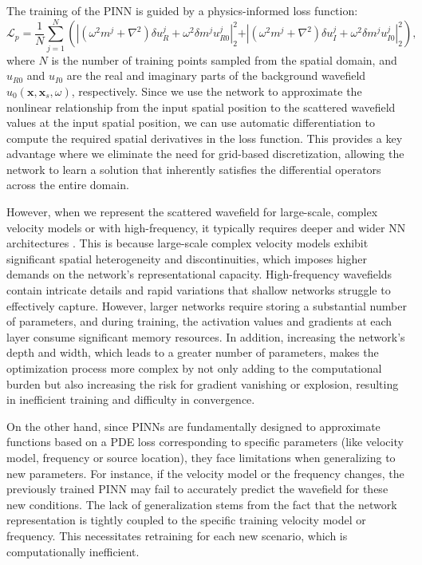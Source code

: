 The training of the PINN is guided by a physics-informed loss function:
\begin{equation}\label{eq6}
\mathcal{L}_{p} = \frac{1}{N}\sum\limits_{j=1}^{N} \left ( {\left|(\omega^2 m^j + \nabla^2)\delta u_R^j + \omega^2 \delta m^j u_{R0}^j \right|_2^2 } \right. 
\left. {+ \left|(\omega^2 m^j + \nabla^2)\delta u_I^j + \omega^2 \delta m^j u_{I0}^j \right|_2^2 }\right),
\end{equation}
where $N$ is the number of training points sampled from the spatial domain, and $u_{R0}$ and $u_{I0}$ are the real and imaginary parts of the background wavefield $u_0(\mathbf{x}, \mathbf{x}_s, \omega)$, respectively. Since we use the network to approximate the nonlinear relationship from the input spatial position to the scattered wavefield values at the input spatial position, we can use automatic differentiation to compute the required spatial derivatives in the loss function. This provides a key advantage where we eliminate the need for grid-based discretization, allowing the network to learn a solution that inherently satisfies the differential operators across the entire domain. 

However, when we represent the scattered wavefield for large-scale, complex velocity models or with high-frequency, it typically requires deeper and wider NN architectures \citep{alkhalifah2021wavefield}. This is because large-scale complex velocity models exhibit significant spatial heterogeneity and discontinuities, which imposes higher demands on the network's representational capacity. High-frequency wavefields contain intricate details and rapid variations that shallow networks struggle to effectively capture. However, larger networks require storing a substantial number of parameters, and during training, the activation values and gradients at each layer consume significant memory resources. In addition, increasing the network's depth and width, which leads to a greater number of parameters, makes the optimization process more complex by not only adding to the computational burden but also increasing the risk for gradient vanishing or explosion, resulting in inefficient training and difficulty in convergence. 

On the other hand, since PINNs are fundamentally designed to approximate functions based on a PDE loss corresponding to specific parameters (like velocity model, frequency or source location), they face limitations when generalizing to new parameters. For instance, if the velocity model or the frequency changes, the previously trained PINN may fail to accurately predict the wavefield for these new conditions. The lack of generalization stems from the fact that the network representation is tightly coupled to the specific training velocity model or frequency. This necessitates retraining for each new scenario, which is computationally inefficient. 

